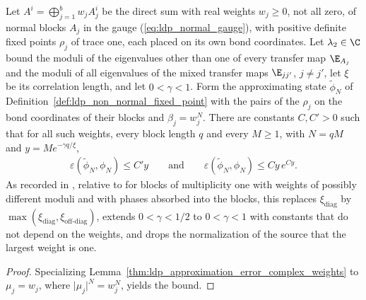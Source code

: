 \begin{lemma}
    \label{thm:ldp_approximation_error_overlapping_weights}
    \leanok
    Let $A^i=\bigoplus_{j=1}^bw_jA_j^i$ be the direct sum with real weights
    $w_j\geq0$, not all zero, of normal blocks $A_j$ in the gauge
    (\ref{eq:ldp_normal_gauge}), with positive definite fixed points $\rho_j$ of trace one,
    each placed on its own bond coordinates. Let $\lambda_2\in\C$ bound the moduli of the
    eigenvalues other than one of every transfer map $\E_{A_j}$ and the moduli of all
    eigenvalues of the mixed transfer maps $\E_{jj'}$, $j\neq j'$, let $\xi$ be its
    correlation length, and let $0<\gamma<1$. Form the approximating state
    $\widetilde\phi_N$ of Definition~\ref{def:ldp_non_normal_fixed_point} with the pairs
    of the $\rho_j$ on the bond coordinates of their blocks and $\beta_j=w_j^N$. There are
    constants $C,C'>0$ such that for all such weights, every block length $q$ and every
    $M\geq1$, with $N=qM$ and $y=Me^{-\gamma q/\xi}$,
    \begin{align*}
        \varepsilon(\widetilde\phi_N,\phi_N)\leq C'y
        \qquad\text{and}\qquad
        \varepsilon(\widetilde\phi_N,\phi_N)\leq Cy\,e^{Cy}.
    \end{align*}
    As recorded in \cite{gap:mswc24_block_form_mixed_overlap}, relative to
    \cite[Lemma~1$'$(ii)]{Malz2024Preparation} for blocks of multiplicity one with weights
    of possibly different moduli and with phases absorbed into the blocks, this replaces
    $\xi_{\mathrm{diag}}$ by
    $\max(\xi_{\mathrm{diag}},\xi_{\mathrm{off\text{-}diag}})$, extends $0<\gamma<1/2$ to
    $0<\gamma<1$ with constants that do not depend on the weights, and drops the
    normalization of the source that the largest weight is one.
\end{lemma}
\begin{proof}
    \leanok
    Specializing Lemma~\ref{thm:ldp_approximation_error_complex_weights} to
    $\mu_j=w_j$, where $\lvert\mu_j\rvert^N=w_j^N$, yields the bound.
\end{proof}
